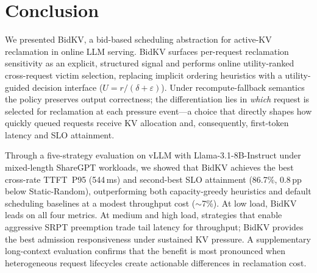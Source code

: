 \documentclass[sigconf,nonacm]{acmart}
\newcommand{\bidkv}{BidKV\xspace}
\newcommand{\utilfn}{\ensuremath{U}}
\newcommand{\tokfree}{\ensuremath{r}}
\newcommand{\qualdelta}{\ensuremath{\delta}}
\newcommand{\stabeps}{\ensuremath{\varepsilon}}
\begin{document}


\section{Conclusion}\label{sec:conclusion}

We presented \bidkv, a bid-based scheduling abstraction for active-KV
reclamation in online LLM serving.  \bidkv surfaces per-request reclamation
sensitivity as an explicit, structured signal and performs online
utility-ranked cross-request victim selection, replacing implicit ordering
heuristics
with a utility-guided decision interface
($\utilfn = \tokfree / (\qualdelta + \stabeps)$).  Under recompute-fallback
semantics the policy preserves output correctness; the differentiation lies
in \emph{which} request is selected for reclamation at each pressure
event---a choice that directly shapes how quickly queued requests receive KV
allocation and, consequently, first-token latency and SLO attainment.

Through a five-strategy evaluation on vLLM with Llama-3.1-8B-Instruct under
mixed-length ShareGPT workloads, we showed that \bidkv achieves the best cross-rate TTFT~P95 (544\,ms) and
second-best SLO attainment (86.7\%, 0.8\,pp below Static-Random),
outperforming both capacity-greedy heuristics and default scheduling
baselines at a modest throughput cost (${\sim}$7\%).  At low load, \bidkv leads on all four metrics.
At medium and high load, strategies that enable aggressive SRPT preemption
trade tail latency for throughput; \bidkv provides the best admission
responsiveness under sustained KV pressure.  A supplementary long-context
evaluation confirms that the benefit is most pronounced when heterogeneous
request lifecycles create actionable differences in reclamation cost.
\end{document}
